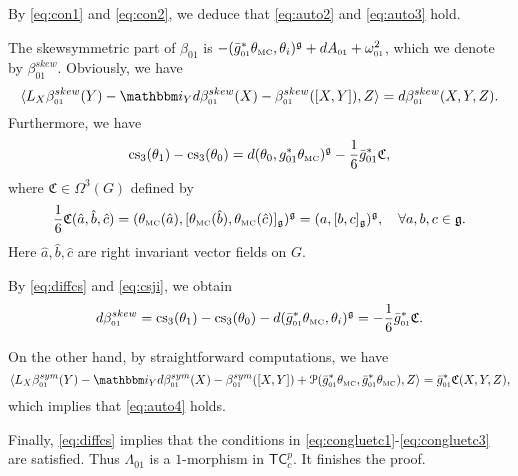 \documentclass[letterpaper,10pt, oneside]{article} %
\newcommand{\tcalgdp}{{\mathsf{TC}^{p}_{c}}} %
\newcommand{\ii}{\mathbbm i}
\newcommand{\cs}{\mathrm{cs}}
\newcommand{\TM}{\theta_{\scriptscriptstyle \mathrm{MC}}}
\newcommand{\huaP}{\mathcal{P}}
\newcommand{\frkC}{\mathfrak C}
\def\qed{\hfill ~\vrule height6pt width6pt depth0pt}
\begin{document}
 By \eqref{eq:con1} and \eqref{eq:con2}, we deduce that   \eqref{eq:auto2} and \eqref{eq:auto3} hold.

 The skewsymmetric part of $\beta_{\scriptscriptstyle 01}$ is $-(\bar{g}_{\scriptscriptstyle 01}^*\TM,\theta_i)^\g+dA_{\scriptscriptstyle 01}+\omega^2_{\scriptscriptstyle 01}$, which we denote by $\beta_{\scriptscriptstyle 01}^{skew}$. Obviously, we have
 $$\langle L_X\beta_{\scriptscriptstyle 01}^{skew}(Y)-\ii_Y d\beta_{\scriptscriptstyle 01}^{skew}(X)-\beta_{\scriptscriptstyle 01}^{skew}([X,Y]),Z\rangle=d\beta_{\scriptscriptstyle 01}^{skew}(X,Y,Z).$$
Furthermore, we have
\begin{equation}\label{eq:csji}
    \cs_3(\theta_1)- \cs_3(\theta_0)=d(\theta_0,g_{01}^*\TM)^\g-\frac{1}{6}\bar{g}_{01}^*\frkC,
\end{equation}
where $\frkC\in\Omega^3(G)$ defined by
$$
\frac{1}{6}\frkC(\hat{a},\hat{b},\hat{c})=(\TM(\hat{a}),[\TM(\hat{b}),\TM(\hat{c})]_\g)^\g=(a,[b,c]_\g)^\g,\quad \forall a, b, c\in\g.
$$
Here $\hat{a},\hat{b},\hat{c}$ are right invariant vector fields on  $G$.


 By \eqref{eq:diffcs} and \eqref{eq:csji}, we obtain
 \begin{equation}
 d\beta_{\scriptscriptstyle 01}^{skew}=\cs_3(\theta_1)-\cs_3(\theta_0)-d(\bar{g}_{\scriptscriptstyle 01}^*\TM,\theta_i)^\g=-\frac{1}{6}\bar{g}_{\scriptscriptstyle 01}^*\frkC.
\end{equation}

 On the other hand, by straightforward computations, we have
 $$
 \langle L_X\beta_{\scriptscriptstyle 01}^{sym}(Y)-\ii_Y d\beta_{\scriptscriptstyle 01}^{sym}(X)-\beta_{\scriptscriptstyle 01}^{sym}([X,Y])+\huaP(\bar{g}_{\scriptscriptstyle 01}^*\TM,\bar{g}_{\scriptscriptstyle 01}^*\TM),Z\rangle =\bar{g}_{\scriptscriptstyle 01}^*\frkC(X,Y,Z),
 $$
 which implies that
 \eqref{eq:auto4}  holds.


Finally, \eqref{eq:diffcs} implies that the conditions in \eqref{eq:congluetc1}-\eqref{eq:congluetc3} are satisfied. Thus $\Lambda_{\scriptscriptstyle 01}$ is a $1$-morphism in $\tcalgdp$.
It finishes the proof. \qed
\vspace{3mm}
\end{document}
